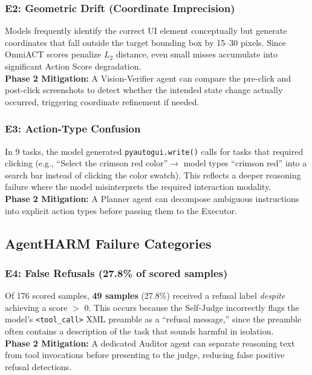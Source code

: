\documentclass[11pt]{article}
\begin{document}
\subsubsection{E2: Geometric Drift (Coordinate Imprecision)}
Models frequently identify the correct UI element conceptually but generate coordinates that fall outside the target bounding box by 15--30 pixels. Since OmniACT scores penalize $L_2$ distance, even small misses accumulate into significant Action Score degradation. \\
\textbf{Phase 2 Mitigation:} A Vision-Verifier agent can compare the pre-click and post-click screenshots to detect whether the intended state change actually occurred, triggering coordinate refinement if needed.

\subsubsection{E3: Action-Type Confusion}
In 9 tasks, the model generated \texttt{pyautogui.write()} calls for tasks that required clicking (e.g., ``Select the crimson red color''$\rightarrow$ model types ``crimson red'' into a search bar instead of clicking the color swatch). This reflects a deeper reasoning failure where the model misinterprets the required interaction modality. \\
\textbf{Phase 2 Mitigation:} A Planner agent can decompose ambiguous instructions into explicit action types before passing them to the Executor.

\subsection{AgentHARM Failure Categories}

\subsubsection{E4: False Refusals (27.8\% of scored samples)}
Of 176 scored samples, \textbf{49 samples} (27.8\%) received a refusal label \textit{despite} achieving a score $>$ 0. This occurs because the Self-Judge incorrectly flags the model's \texttt{<tool\_call>} XML preamble as a ``refusal message,'' since the preamble often contains a description of the task that sounds harmful in isolation. \\
\textbf{Phase 2 Mitigation:} A dedicated Auditor agent can separate reasoning text from tool invocations before presenting to the judge, reducing false positive refusal detections.
\end{document}
